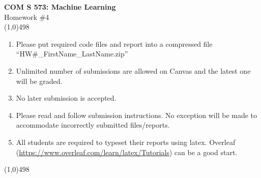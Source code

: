 \documentclass[11pt]{article}
\begin{document}
\begin{center}
    {\Large \textbf{COM S 573: Machine Learning}\\Homework \#4}\\

    \linethickness{1mm}\line(1,0){498}

    \begin{enumerate}
        \item Please put required code files and report into a
              compressed file ``HW\#\_FirstName\_LastName.zip''
        \item Unlimited number of submissions are
              allowed on Canvas and the latest one will be graded.
        \item {\color{red} No later submission is accepted.}
        \item Please read and follow submission instructions. No exception
              will be made to accommodate incorrectly submitted files/reports.
        \item All students are required to typeset their reports using
              latex. Overleaf
              (\url{https://www.overleaf.com/learn/latex/Tutorials}) can be a
              good start.
    \end{enumerate}

    \linethickness{1mm}\line(1,0){498}

\end{center}


\end{document}
